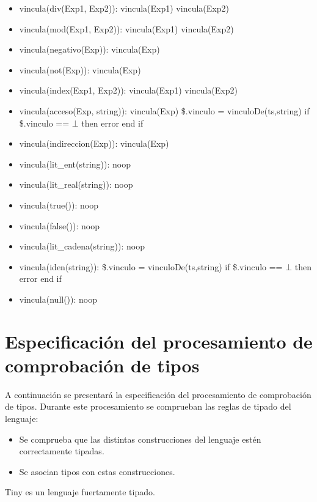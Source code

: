 \documentclass[11pt]{article}
\begin{document}
\begin{itemize}
                \item vincula(div(Exp1, Exp2)): 
                    \subitem vincula(Exp1) 
                    \subitem vincula(Exp2)
                \item vincula(mod(Exp1, Exp2)): 
                    \subitem vincula(Exp1) 
                    \subitem vincula(Exp2)
                \item vincula(negativo(Exp)): 
                    \subitem vincula(Exp)
                \item vincula(not(Exp)): 
                    \subitem vincula(Exp)
                \item vincula(index(Exp1, Exp2)): 
                    \subitem vincula(Exp1) 
                    \subitem vincula(Exp2)
                \item vincula(acceso(Exp, string)): 
                    \subitem vincula(Exp) 
                    \subitem \$.vinculo = vinculoDe(ts,string) 
                    \subitem if \$.vinculo == $\bot$ then 
                        \subsubitem error 
                    \subitem end if
                \item vincula(indireccion(Exp)): 
                    \subitem vincula(Exp)
                \item vincula(lit\_ent(string)): 
                    \subitem noop
                \item vincula(lit\_real(string)): 
                    \subitem noop
                \item vincula(true()): 
                    \subitem noop
                \item vincula(false()): 
                    \subitem noop
                \item vincula(lit\_cadena(string)): 
                    \subitem noop
                \item vincula(iden(string)): 
                    \subitem \$.vinculo = vinculoDe(ts,string) 
                    \subitem if \$.vinculo == $\bot$ then 
                        \subsubitem error 
                    \subitem end if
                \item vincula(null()): 
                    \subitem noop
            \end{itemize}

    
    \section{Especificación del procesamiento de comprobación de tipos}
        A continuación se presentará la especificación del procesamiento de comprobación de tipos. Durante este procesamiento se comprueban las reglas de tipado del lenguaje:
        \begin{itemize}
            \item Se comprueba que las distintas construcciones del lenguaje estén
            correctamente tipadas.
            \item Se asocian tipos con estas construcciones.
        \end{itemize}
        Tiny es un lenguaje fuertamente tipado. 

        
\end{document}
